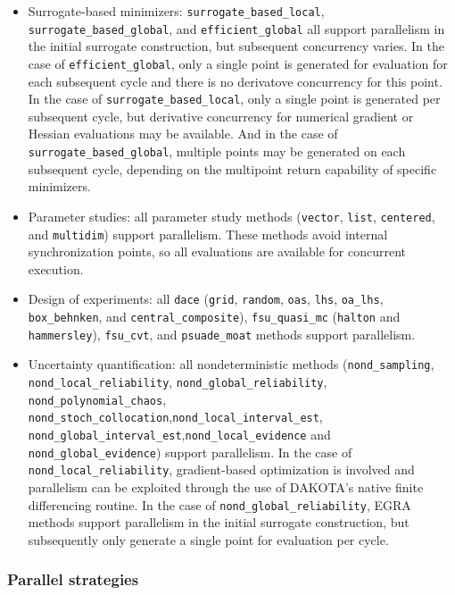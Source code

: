 \begin{itemize}
\item Surrogate-based minimizers: \texttt{surrogate\_based\_local},
  \texttt{surrogate\_based\_global}, and \texttt{efficient\_global}
  all support parallelism in the initial surrogate construction, but
  subsequent concurrency varies.  In the case of
  \texttt{efficient\_global}, only a single point is generated for
  evaluation for each subsequent cycle and there is no derivatove
  concurrency for this point.  In the case of
  \texttt{surrogate\_based\_local}, only a single point is generated
  per subsequent cycle, but derivative concurrency for numerical
  gradient or Hessian evaluations may be available.  And in the case
  of \texttt{surrogate\_based\_global}, multiple points may be
  generated on each subsequent cycle, depending on the multipoint
  return capability of specific minimizers.

\item Parameter studies: all parameter study methods (\texttt{vector},
  \texttt{list}, \texttt{centered}, and \texttt{multidim}) support
  parallelism. These methods avoid internal synchronization points, so
  all evaluations are available for concurrent execution.

\item Design of experiments: all \texttt{dace} (\texttt{grid},
  \texttt{random}, \texttt{oas}, \texttt{lhs}, \texttt{oa\_lhs},
  \texttt{box\_behnken}, and \texttt{central\_composite}),
  \texttt{fsu\_quasi\_mc} (\texttt{halton} and \texttt{hammersley}),
  \texttt{fsu\_cvt}, and \texttt{psuade\_moat} methods support
  parallelism.

\item Uncertainty quantification: all nondeterministic methods
  (\texttt{nond\_sampling}, \texttt{nond\_local\_reliability},
  \texttt{nond\_global\_reliability}, \texttt{nond\_polynomial\_chaos},
  \texttt{nond\_stoch\_collocation},\texttt{nond\_local\_interval\_est}, 
  \texttt{nond\_global\_interval\_est},\texttt{nond\_local\_evidence} and 
  \texttt{nond\_global\_evidence})
  support parallelism. In the case of
  \texttt{nond\_local\_reliability}, gradient-based optimization is
  involved and parallelism can be exploited through the use of
  DAKOTA's native finite differencing routine.  In the case of
  \texttt{nond\_global\_reliability}, EGRA methods support parallelism
  in the initial surrogate construction, but subsequently only
  generate a single point for evaluation per cycle.
\end{itemize}

\subsubsection{Parallel strategies}\label{parallel:algorithms:strategies}

